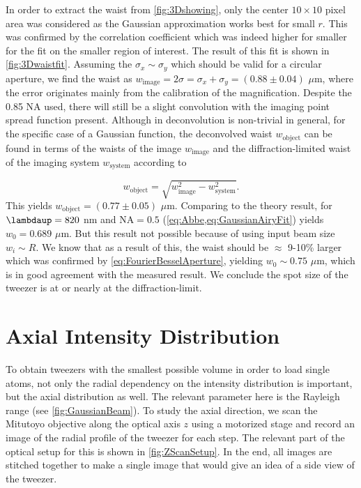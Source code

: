 In order to extract the waist from \cref{fig:3Dshowing}, only the center $10 \times 10$ pixel area was considered as the Gaussian approximation works best for small $r$. 
This was confirmed by the correlation coefficient which was indeed higher for smaller for the fit on the smaller region of interest. 
The result of this fit is shown in \cref{fig:3Dwaistfit}.
Assuming the $\sigma_x \sim \sigma_y$ which should be valid for a circular aperture, we find the waist as $w_{\text{image}} = 2\sigma = \sigma_x + \sigma_y = (0.88 \pm 0.04)$ $\mu$m, where the error originates mainly from the calibration of the magnification. 
Despite the 0.85 NA used, there will still be a slight convolution with the imaging point spread function present. 
Although in deconvolution is non-trivial in general, for the specific case of a Gaussian function, the deconvolved waist $w_{\text{object}}$ can be found in terms of the waists of the image $w_{\text{image}}$ and the diffraction-limited waist of the imaging system $w_{\text{system}}$ according to \cite{Knottnerus2018}

\begin{equation}\label{eq:Deconvolution}
    w_{\text{object}} = \sqrt{w_{\text{image}}^2-w_{\text{system}}^2}.
\end{equation}
This yields $w_{\text{object}} = (0.77 \pm 0.05)$ $\mu$m. 
Comparing to the theory result, for $\lambdaup = 820$ nm and $\text{NA} = 0.5$ (\cref{eq:Abbe,eq:GaussianAiryFit}) yields $w_0 = 0.689$ $\mu$m. 
But this result not possible because of using input beam size $w_i \sim R$. 
We know that as a result of this, the waist should be $\approx$ 9-10\% larger \cite{Chon2007,Sortais2007} which was confirmed by \cref{eq:FourierBesselAperture}, yielding $w_0 \sim 0.75$ $\mu$m, which is in good agreement with the measured result.
We conclude the spot size of the tweezer is at or nearly at the diffraction-limit.

\section{Axial Intensity Distribution}\label{sec:Tweezer3D}

To obtain tweezers with the smallest possible volume in order to load single atoms, not only the radial dependency on the intensity distribution is important, but the axial distribution as well.
The relevant parameter here is the Rayleigh range (see \cref{fig:GaussianBeam}).
To study the axial direction, we scan the Mitutoyo objective along the optical axis $z$ using a motorized stage and record an image of the radial profile of the tweezer for each step.
The relevant part of the optical setup for this is shown in \cref{fig:ZScanSetup}.
In the end, all images are stitched together to make a single image that would give an idea of a side view of the tweezer.

